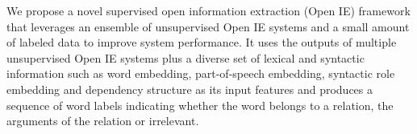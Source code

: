 We propose a novel supervised open information extraction (Open IE) framework that leverages an ensemble of unsupervised Open IE systems and a small amount of labeled data to improve system performance. 
It uses the outputs of multiple unsupervised Open IE systems  plus a diverse set of lexical and syntactic information such as word embedding, part-of-speech embedding, syntactic role embedding and dependency structure as its input features and produces a sequence of word labels indicating whether the word belongs to a relation,  the arguments of the relation or irrelevant.